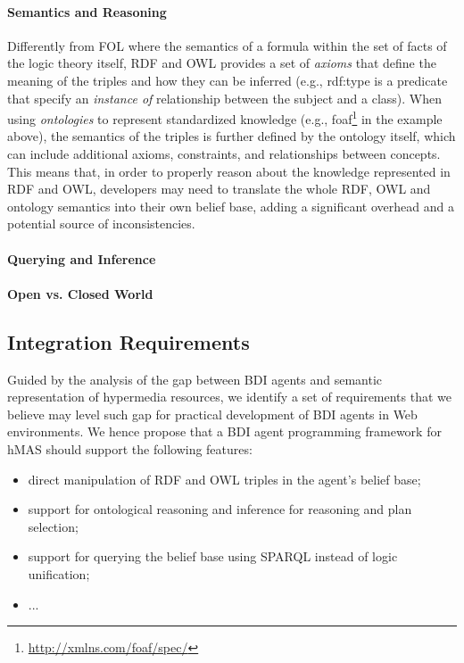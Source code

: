 \documentclass[
]{ceurart}
\begin{document}
\paragraph{Semantics and Reasoning}
Differently from \ac{FOL} where the semantics of a formula within the set of facts of the logic theory itself, 
\ac{RDF} and \ac{OWL} provides a set of \emph{axioms} that define the meaning of the triples and how they can be inferred (e.g., \textsf{rdf:type} is a predicate that specify an \emph{instance of} relationship between the subject and a class).
%
When using \emph{ontologies} to represent standardized knowledge (e.g., \textsf{foaf}\footnote{\url{http://xmlns.com/foaf/spec/}} in the example above), 
the semantics of the triples is further defined by the ontology itself,
which can include additional axioms, constraints, and relationships between concepts.
%
This means that, in order to properly reason about the knowledge represented in \ac{RDF} and \ac{OWL},
developers may need to translate the whole \ac{RDF}, \ac{OWL} and ontology semantics into their own belief base, adding a significant overhead and a potential source of inconsistencies. 


\paragraph{Querying and Inference}


\paragraph{Open vs. Closed World}



\subsection{Integration Requirements}
\label{subsec:integration-requirements}

Guided by the analysis of the gap between \ac{BDI} agents and semantic representation of hypermedia resources,
we identify a set of requirements that we believe may level such gap for practical development of \ac{BDI} agents in Web environments.
We hence propose that a \ac{BDI} agent programming framework for \ac{hMAS} should support the following features:
\begin{itemize}
  \item direct manipulation of \ac{RDF} and \ac{OWL} triples in the agent's belief base;
  \item support for ontological reasoning and inference for reasoning and plan selection;
  \item support for querying the belief base using \ac{SPARQL} instead of logic unification;
  \item ...
\end{itemize}
\end{document}
